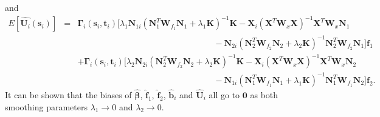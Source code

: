 \documentclass[12pt, notitlepage]{article}
\begin{document}
and
 \begin{eqnarray*}
E\left[
\hat {\boldsymbol U_i}(\boldsymbol s_i) 
\right] 
&=& 
\boldsymbol \Gamma_i(\boldsymbol s_i, \boldsymbol t_i) 
[
\lambda_1 \boldsymbol N_{1i}
 (\boldsymbol N_1^T \boldsymbol W_{f_1}  \boldsymbol N_1 + \lambda_1 \boldsymbol K)^{-1}  
\boldsymbol K
-  
\boldsymbol X_i(\boldsymbol X^T  \boldsymbol W_x \boldsymbol X )^{-1} \boldsymbol X^T  \boldsymbol W_x  \boldsymbol N_1
\\
&&
\quad\quad \quad \quad \quad \quad \quad\quad \quad \quad \quad \quad\quad \quad\quad\quad
-
 \boldsymbol N_{2i}
(\boldsymbol N_2^T \boldsymbol W_{f_2}  \boldsymbol N_2 + \lambda_2 \boldsymbol K)^{-1}  \boldsymbol N_2^T \boldsymbol W_{f_2} 
\boldsymbol N_{1} 
 ]
  \boldsymbol f_1  
\\
&&
+
\boldsymbol \Gamma_i(\boldsymbol s_i, \boldsymbol t_i) 
[
\lambda_2 \boldsymbol N_{2i}
(\boldsymbol N_2^T \boldsymbol W_{f_2}  \boldsymbol N_2 + \lambda_2 \boldsymbol K)^{-1}
  \boldsymbol K
-  
\boldsymbol X_i(\boldsymbol X^T  \boldsymbol W_x \boldsymbol X )^{-1} \boldsymbol X^T  \boldsymbol W_x  \boldsymbol N_2
\\
&& 
\quad \quad \quad \quad \quad \quad \quad \quad \quad \quad \quad\quad\quad\quad\quad\quad
-
 \boldsymbol N_{1i}
 (\boldsymbol N_1^T \boldsymbol W_{f_1}  \boldsymbol N_1 + \lambda_1 \boldsymbol K)^{-1}  
\boldsymbol N_1^T \boldsymbol W_{f_1}
\boldsymbol N_2
 ]
  \boldsymbol f_2.
  \end{eqnarray*}
It can be shown that the biases of $\boldsymbol {\hat \beta}$, $\boldsymbol {\hat f}_1$, $\boldsymbol {\hat f}_2$, $\boldsymbol {\hat b}_i$ and $\boldsymbol {\hat U}_i$ all go to $\boldsymbol 0$ as both smoothing parameters $\lambda_1 \to 0$ and $\lambda_2 \to 0$.
\end{document}

